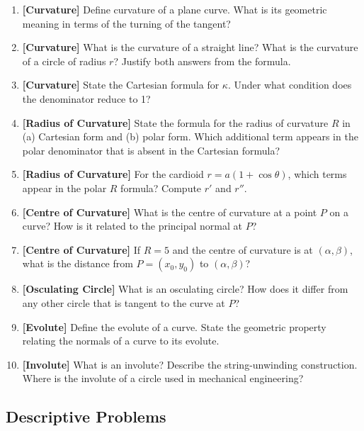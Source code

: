 \documentclass[12pt,a4paper]{article}
\begin{document}
\begin{enumerate}[label=\textbf{V\arabic*.}]

\item \textbf{[Curvature]} Define curvature of a plane curve. What is its geometric meaning in terms of the turning of the tangent?

\item \textbf{[Curvature]} What is the curvature of a straight line? What is the curvature of a circle of radius $r$? Justify both answers from the formula.

\item \textbf{[Curvature]} State the Cartesian formula for $\kappa$. Under what condition does the denominator reduce to 1?

\item \textbf{[Radius of Curvature]} State the formula for the radius of curvature $R$ in (a) Cartesian form and (b) polar form. Which additional term appears in the polar denominator that is absent in the Cartesian formula?

\item \textbf{[Radius of Curvature]} For the cardioid $r = a(1+\cos\theta)$, which terms appear in the polar $R$ formula? Compute $r'$ and $r''$.

\item \textbf{[Centre of Curvature]} What is the centre of curvature at a point $P$ on a curve? How is it related to the principal normal at $P$?

\item \textbf{[Centre of Curvature]} If $R = 5$ and the centre of curvature is at $(\alpha, \beta)$, what is the distance from $P = (x_0, y_0)$ to $(\alpha, \beta)$?

\item \textbf{[Osculating Circle]} What is an osculating circle? How does it differ from any other circle that is tangent to the curve at $P$?

\item \textbf{[Evolute]} Define the evolute of a curve. State the geometric property relating the normals of a curve to its evolute.

\item \textbf{[Involute]} What is an involute? Describe the string-unwinding construction. Where is the involute of a circle used in mechanical engineering?

\end{enumerate}

\subsection*{Descriptive Problems}
\end{document}
